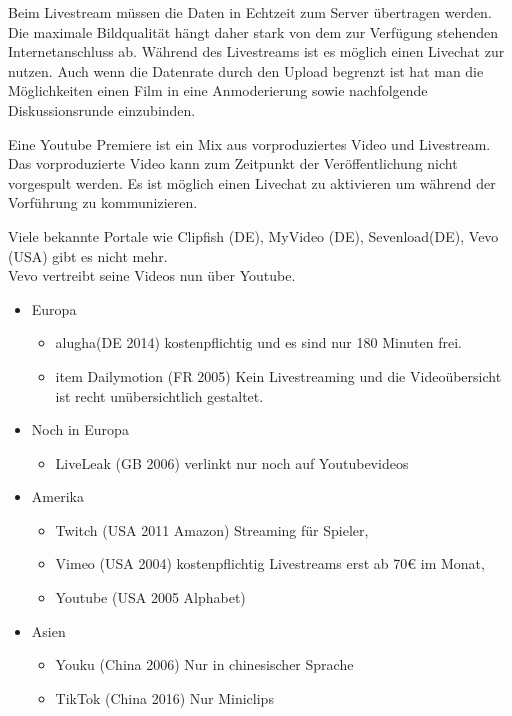 Beim Livestream müssen die Daten in Echtzeit zum Server übertragen werden.
Die maximale Bildqualität hängt daher stark von dem zur Verfügung stehenden Internetanschluss ab.
Während des Livestreams ist es möglich einen Livechat zur nutzen.
Auch wenn die Datenrate durch den Upload begrenzt ist hat man die Möglichkeiten einen Film in eine Anmoderierung sowie nachfolgende Diskussionsrunde einzubinden.




Eine Youtube Premiere ist ein Mix aus vorproduziertes Video und Livestream.
Das vorproduzierte Video kann zum Zeitpunkt der Veröffentlichung nicht vorgespult werden.
Es ist möglich einen Livechat zu aktivieren um während der Vorführung zu kommunizieren.




\newpage
{}

Viele bekannte Portale wie Clipfish (DE), MyVideo (DE), Sevenload(DE), Vevo (USA) gibt es nicht mehr.\\
Vevo vertreibt seine Videos nun über Youtube.\\


\begin{itemize}
  \item Europa
  \begin{itemize}
    \item alugha(DE 2014) kostenpflichtig und es sind nur 180 Minuten frei.
    \item item Dailymotion (FR 2005) Kein Livestreaming und die Videoübersicht ist recht unübersichtlich gestaltet.
  \end{itemize}
  \item Noch in Europa
  \begin{itemize}
    \item LiveLeak (GB 2006) verlinkt nur noch auf Youtubevideos
  \end{itemize}
  \item Amerika
  \begin{itemize}
    \item Twitch (USA 2011 Amazon) Streaming für Spieler,
    \item Vimeo (USA 2004) kostenpflichtig Livestreams erst ab 70€ im Monat,
    \item Youtube (USA 2005 Alphabet)
  \end{itemize}
  \item Asien
  \begin{itemize}
    \item Youku (China 2006) Nur in chinesischer Sprache
    \item TikTok (China 2016) Nur Miniclips
  \end{itemize}
\end{itemize}


